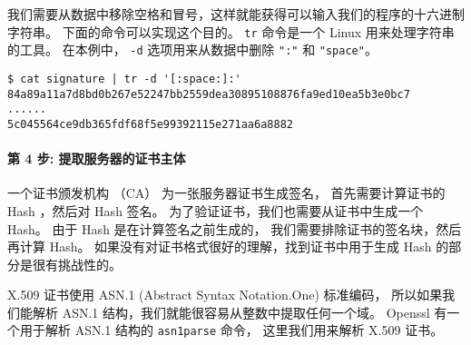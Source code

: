 我们需要从数据中移除空格和冒号，这样就能获得可以输入我们的程序的十六进制字符串。
下面的命令可以实现这个目的。
\texttt{tr} 命令是一个 Linux 用来处理字符串的工具。
在本例中， \texttt{-d} 选项用来从数据中删除 \texttt{":"} 和 \texttt{"space"}。

\begin{lstlisting}
$ cat signature | tr -d '[:space:]:'
84a89a11a7d8bd0b267e52247bb2559dea30895108876fa9ed10ea5b3e0bc7
......
5c045564ce9db365fdf68f5e99392115e271aa6a8882
\end{lstlisting}



\begin{comment}
\begin{lstlisting}
$ openssl x509 -in Chase.crt -text -noout -certopt ca_default
               -certopt no_validity -certopt no_serial
	       -certopt no_subject -certopt no_extensions
	       -certopt no_signame | grep -v 'Signature Algorithm'
	                           | tr -d '[:space:]:'
\end{lstlisting}
\end{comment}



\paragraph{第 4 步: 提取服务器的证书主体}
一个证书颁发机构 （CA） 为一张服务器证书生成签名，
首先需要计算证书的 Hash ，然后对 Hash 签名。
为了验证证书，我们也需要从证书中生成一个 Hash。
由于 Hash 是在计算签名之前生成的，
我们需要排除证书的签名块，然后再计算 Hash。
如果没有对证书格式很好的理解，找到证书中用于生成 Hash 的部分是很有挑战性的。




X.509 证书使用 ASN.1 (Abstract Syntax Notation.One) 标准编码，
所以如果我们能解析 ASN.1 结构，我们就能很容易从整数中提取任何一个域。
Openssl 有一个用于解析 ASN.1 结构的 \texttt{asn1parse} 命令，
这里我们用来解析 X.509 证书。


